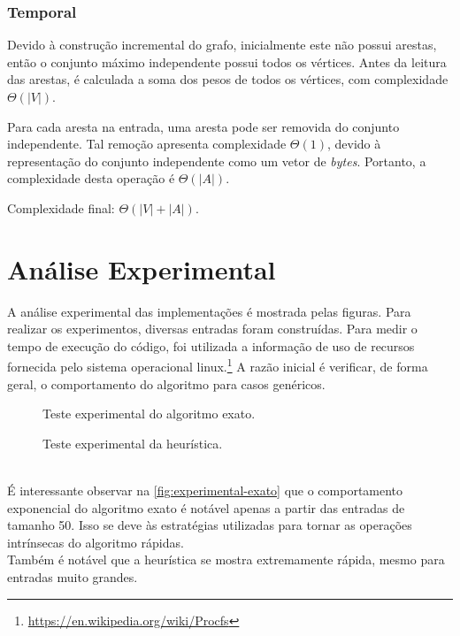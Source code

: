 \documentclass{article}
\begin{document}
\subsubsection{Temporal}
Devido à construção incremental do grafo, inicialmente este não possui arestas, então o conjunto máximo independente possui todos os vértices. Antes da leitura das arestas, é calculada a soma dos pesos de todos os vértices, com complexidade $\Theta(|V|)$.

Para cada aresta na entrada, uma aresta pode ser removida do conjunto independente. Tal remoção apresenta complexidade $\Theta(1)$, devido à representação do conjunto independente como um vetor de \textit{bytes}. Portanto, a complexidade desta operação é $\Theta(|A|)$.

Complexidade final: $\Theta(|V| + |A|)$.


\pagebreak


\section{Análise Experimental}
A análise experimental das implementações é mostrada pelas figuras. Para realizar os experimentos, diversas entradas foram construídas. Para medir o tempo de execução do código, foi utilizada a informação de uso de recursos fornecida pelo sistema operacional linux.\footnote{\url{https://en.wikipedia.org/wiki/Procfs}} A razão inicial é verificar, de forma geral, o comportamento do algoritmo para casos genéricos.
\begin{figure}[h]
  \centering
  
  
  \caption{Teste experimental do algoritmo exato.}
  \label{fig:experimental-exato}
\end{figure}
\vspace{-10pt}
\begin{figure}[h]
  \centering
  
  
  \caption{Teste experimental da heurística.}
\end{figure} \\
É interessante observar na \autoref{fig:experimental-exato} que o comportamento exponencial do algoritmo exato é notável apenas a partir das entradas de tamanho 50. Isso se deve às estratégias utilizadas para tornar as operações intrínsecas do algoritmo rápidas.
\\[5pt]
Também é notável que a heurística se mostra extremamente rápida, mesmo para entradas muito grandes.
\end{document}
